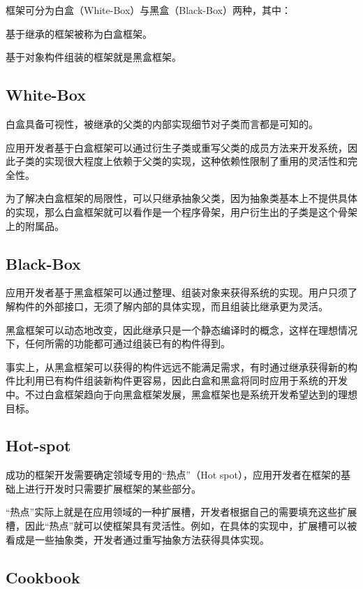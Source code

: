 框架可分为白盒（White-Box）与黑盒（Black-Box）两种，其中：

\begin{compactitem}
\item 基于继承的框架被称为白盒框架。
\item 基于对象构件组装的框架就是黑盒框架。
\end{compactitem}

\subsection{White-Box}


白盒具备可视性，被继承的父类的内部实现细节对子类而言都是可知的。

应用开发者基于白盒框架可以通过衍生子类或重写父类的成员方法来开发系统，因此子类的实现很大程度上依赖于父类的实现，这种依赖性限制了重用的灵活性和完全性。

为了解决白盒框架的局限性，可以只继承抽象父类，因为抽象类基本上不提供具体的实现，那么白盒框架就可以看作是一个程序骨架，用户衍生出的子类是这个骨架上的附属品。

\subsection{Black-Box}

应用开发者基于黑盒框架可以通过整理、组装对象来获得系统的实现。用户只须了解构件的外部接口，无须了解内部的具体实现，而且组装比继承更为灵活。

黑盒框架可以动态地改变，因此继承只是一个静态编译时的概念，这样在理想情况下，任何所需的功能都可通过组装已有的构件得到。

事实上，从黑盒框架可以获得的构件远远不能满足需求，有时通过继承获得新的构件比利用已有构件组装新构件更容易，因此白盒和黑盒将同时应用于系统的开发中。不过白盒框架趋向于向黑盒框架发展，黑盒框架也是系统开发希望达到的理想目标。

\subsection{Hot-spot}

成功的框架开发需要确定领域专用的“热点”（Hot spot），应用开发者在框架的基础上进行开发时只需要扩展框架的某些部分。

“热点”实际上就是在应用领域的一种扩展槽，开发者根据自己的需要填充这些扩展槽，因此“热点”就可以使框架具有灵活性。例如，在具体的实现中，扩展槽可以被看成是一些抽象类，开发者通过重写抽象方法获得具体实现。

\subsection{Cookbook}


